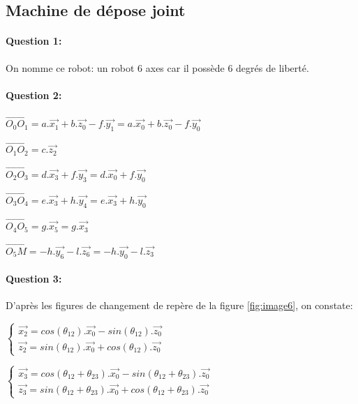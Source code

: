 \newpage

\subsection{Machine de dépose joint}

\paragraph{Question 1:} On nomme ce robot: \og un robot 6 axes \fg car il possède 6 degrés de liberté.

\paragraph{Question 2:}

$\overrightarrow{O_0O_1}=a.\overrightarrow{x_1}+b.\overrightarrow{z_0}-f.\overrightarrow{y_1}=a.\overrightarrow{x_0}+b.\overrightarrow{z_0}-f.\overrightarrow{y_0}$

$\overrightarrow{O_1O_2}=c.\overrightarrow{z_2}$

$\overrightarrow{O_2O_3}=d.\overrightarrow{x_3}+f.\overrightarrow{y_3}=d.\overrightarrow{x_0}+f.\overrightarrow{y_0}$

$\overrightarrow{O_3O_4}=e.\overrightarrow{x_3}+h.\overrightarrow{y_4}=e.\overrightarrow{x_3}+h.\overrightarrow{y_0}$

$\overrightarrow{O_4O_5}=g.\overrightarrow{x_5}=g.\overrightarrow{x_3}$

$\overrightarrow{O_5M}=-h.\overrightarrow{y_6}-l.\overrightarrow{z_6}=-h.\overrightarrow{y_0}-l.\overrightarrow{z_3}$

\paragraph{Question 3:} D'après les figures de changement de repère de la figure \ref{fig:image6}, on constate:

$\left\{\begin{array}{l} \overrightarrow{x_2}=cos(\theta_{12}).\overrightarrow{x_0}-sin(\theta_{12}).\overrightarrow{z_0} \\
\overrightarrow{z_2}=sin(\theta_{12}).\overrightarrow{x_0}+cos(\theta_{12}).\overrightarrow{z_0} \end{array}\right.$

$\left\{\begin{array}{l} \overrightarrow{x_3}=cos(\theta_{12}+\theta_{23}).\overrightarrow{x_0}-sin(\theta_{12}+\theta_{23}).\overrightarrow{z_0} \\
\overrightarrow{z_3}=sin(\theta_{12}+\theta_{23}).\overrightarrow{x_0}+cos(\theta_{12}+\theta_{23}).\overrightarrow{z_0} \end{array}\right.$


